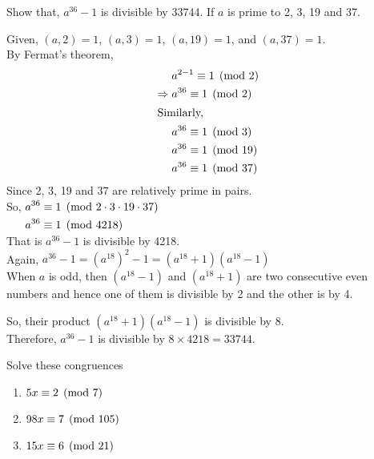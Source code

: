 \documentclass[12pt,class=book,crop=false]{standalone}
\begin{document}
\begin{qn}
    Show that, $ a^{36}-1 $ is divisible by 33744. If $ a  $ is prime to 2, 3, 19 and 37.
\end{qn}
\begin{soln}
    Given, $ (a,2)=1 $, $ (a,3)=1 $, $ (a,19)=1 $, and $ (a,37)=1 $.\\
    By Fermat's theorem,
    \begin{align*}
        & a^{2-1}\equiv 1 \pmod{2}\\
        \Rightarrow\;& a^{36}\equiv 1 \pmod{2}\\
        \intertext{Similarly, }
        & a^{36}\equiv 1 \pmod{3}\\
        & a^{36}\equiv 1 \pmod{19}\\
        & a^{36}\equiv 1 \pmod{37}
    \end{align*}
    Since 2, 3, 19 and 37 are relatively prime in pairs.\\
    So, $ \begin{aligned}[t]
        a^{36} &\equiv 1 \pmod{2\cdot3\cdot19\cdot37}\\
        a^{36} &\equiv 1 \pmod{4218}
    \end{aligned} $\\
    That is $ a^{36}-1 $ is divisible by 4218.\\
    Again, $ a^{36}-1=\left( a^{18} \right)^2-1=(a^{18}+1)(a^{18}-1) $\\
    When $ a $ is odd, then $ (a^{18}-1) $ and $ (a^{18}+1) $ are two consecutive even numbers and hence one of them is divisible by 2 and the other is by 4.

    So, their product $ (a^{18}+1)(a^{18}-1) $ is divisible by 8.\\
    Therefore, $ a^{36}-1 $ is divisible by $ 8\times 4218=33744 $.
\end{soln}
\begin{qn}
    Solve these congruences
    \begin{enumerate}[label=(\alph*)]
        \item $ 5x\equiv 2 \pmod{7} $
        \item $ 98x\equiv 7 \pmod{105} $
        \item $ 15x\equiv 6 \pmod{21} $
    \end{enumerate}
\end{qn}
\end{document}
